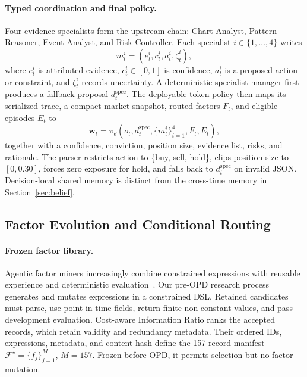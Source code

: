 \paragraph{Typed coordination and final policy.}
Four evidence specialists form the upstream chain: Chart Analyst, Pattern Reasoner, Event Analyst, and Risk Controller. Each specialist $i\in\{1,\ldots,4\}$ writes
\begin{equation}
\label{eq:agent_message}
m_t^i=(e_t^i,c_t^i,a_t^i,\zeta_t^i),
\end{equation}
where $e_t^i$ is attributed evidence, $c_t^i\in[0,1]$ is confidence, $a_t^i$ is a proposed action or constraint, and $\zeta_t^i$ records uncertainty. A deterministic specialist manager first produces a fallback proposal $d_t^{\mathrm{spec}}$. The deployable token policy then maps its serialized trace, a compact market snapshot, routed factors $F_t$, and eligible episodes $E_t$ to
\begin{equation}
\label{eq:decision_manager}
\mathbf w_t=\pi_{\theta}\!\left(o_t,d_t^{\mathrm{spec}},
\{m_t^i\}_{i=1}^{4},F_t,E_t\right),
\end{equation}
together with a confidence, conviction, position size, evidence list, risks, and rationale. The parser restricts action to \{buy, sell, hold\}, clips position size to $[0,0.30]$, forces zero exposure for hold, and falls back to $d_t^{\mathrm{spec}}$ on invalid JSON. Decision-local shared memory is distinct from the cross-time memory in Section~\ref{sec:belief}.

\subsection{Factor Evolution and Conditional Routing}
\label{sec:router}

\paragraph{Frozen factor library.}
Agentic factor miners increasingly combine constrained expressions with reusable experience and deterministic evaluation~\cite{alphaagent2025,factorminer2026,hubble2026,alphaforgebench2026}. Our pre-OPD research process generates and mutates expressions in a constrained DSL. Retained candidates must parse, use point-in-time fields, return finite non-constant values, and pass development evaluation. Cost-aware Information Ratio ranks the accepted records, which retain validity and redundancy metadata. Their ordered IDs, expressions, metadata, and content hash define the 157-record manifest $\mathcal F^\star=\{f_j\}_{j=1}^{M}$, $M=157$. Frozen before OPD, it permits selection but no factor mutation.

